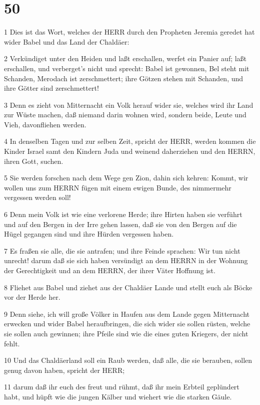 \chapter{50}

\par 1 Dies ist das Wort, welches der HERR durch den Propheten Jeremia geredet hat wider Babel und das Land der Chaldäer:
\par 2 Verkündiget unter den Heiden und laßt erschallen, werfet ein Panier auf; laßt erschallen, und verberget's nicht und sprecht: Babel ist gewonnen, Bel steht mit Schanden, Merodach ist zerschmettert; ihre Götzen stehen mit Schanden, und ihre Götter sind zerschmettert!
\par 3 Denn es zieht von Mitternacht ein Volk herauf wider sie, welches wird ihr Land zur Wüste machen, daß niemand darin wohnen wird, sondern beide, Leute und Vieh, davonfliehen werden.
\par 4 In denselben Tagen und zur selben Zeit, spricht der HERR, werden kommen die Kinder Israel samt den Kindern Juda und weinend daherziehen und den HERRN, ihren Gott, suchen.
\par 5 Sie werden forschen nach dem Wege gen Zion, dahin sich kehren: Kommt, wir wollen uns zum HERRN fügen mit einem ewigen Bunde, des nimmermehr vergessen werden soll!
\par 6 Denn mein Volk ist wie eine verlorene Herde; ihre Hirten haben sie verführt und auf den Bergen in der Irre gehen lassen, daß sie von den Bergen auf die Hügel gegangen sind und ihre Hürden vergessen haben.
\par 7 Es fraßen sie alle, die sie antrafen; und ihre Feinde sprachen: Wir tun nicht unrecht! darum daß sie sich haben versündigt an dem HERRN in der Wohnung der Gerechtigkeit und an dem HERRN, der ihrer Väter Hoffnung ist.
\par 8 Fliehet aus Babel und ziehet aus der Chaldäer Lande und stellt euch als Böcke vor der Herde her.
\par 9 Denn siehe, ich will große Völker in Haufen aus dem Lande gegen Mitternacht erwecken und wider Babel heraufbringen, die sich wider sie sollen rüsten, welche sie sollen auch gewinnen; ihre Pfeile sind wie die eines guten Kriegers, der nicht fehlt.
\par 10 Und das Chaldäerland soll ein Raub werden, daß alle, die sie berauben, sollen genug davon haben, spricht der HERR;
\par 11 darum daß ihr euch des freut und rühmt, daß ihr mein Erbteil geplündert habt, und hüpft wie die jungen Kälber und wiehert wie die starken Gäule.
